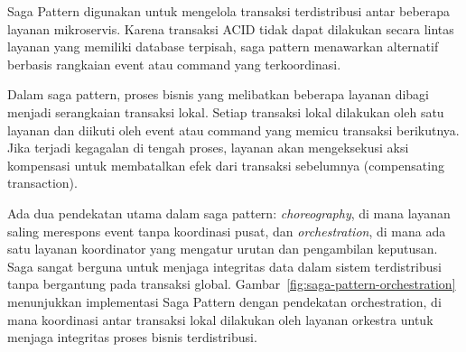 Saga Pattern digunakan untuk mengelola transaksi terdistribusi antar beberapa layanan mikroservis. Karena transaksi ACID tidak dapat dilakukan secara lintas layanan yang memiliki database terpisah, saga pattern menawarkan alternatif berbasis rangkaian event atau command yang terkoordinasi.

Dalam saga pattern, proses bisnis yang melibatkan beberapa layanan dibagi menjadi serangkaian transaksi lokal. Setiap transaksi lokal dilakukan oleh satu layanan dan diikuti oleh event atau command yang memicu transaksi berikutnya. Jika terjadi kegagalan di tengah proses, layanan akan mengeksekusi aksi kompensasi untuk membatalkan efek dari transaksi sebelumnya (compensating transaction).

Ada dua pendekatan utama dalam saga pattern: \textit{choreography}, di mana layanan saling merespons event tanpa koordinasi pusat, dan \textit{orchestration}, di mana ada satu layanan koordinator yang mengatur urutan dan pengambilan keputusan. Saga sangat berguna untuk menjaga integritas data dalam sistem terdistribusi tanpa bergantung pada transaksi global. Gambar~\ref{fig:saga-pattern-orchestration} menunjukkan implementasi Saga Pattern dengan pendekatan orchestration, di mana koordinasi antar transaksi lokal dilakukan oleh layanan orkestra untuk menjaga integritas proses bisnis terdistribusi.

